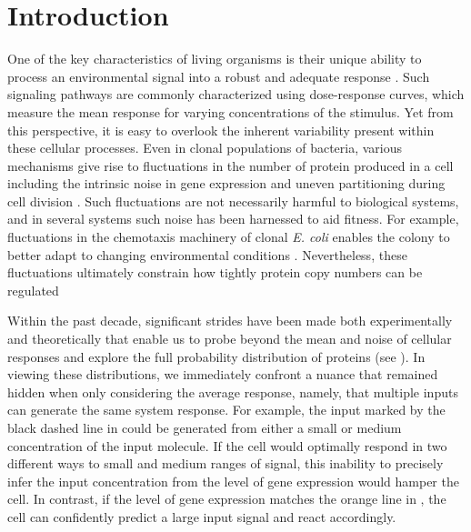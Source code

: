 \section{Introduction}

One of the key characteristics of living organisms is their unique ability to
process an environmental signal into a robust and adequate response
\cite{Nemenman2010}. Such signaling pathways are commonly characterized using
dose-response curves, which measure the mean response for varying concentrations
of the stimulus. Yet from this perspective, it is easy to overlook the inherent
variability present within these cellular processes. %
Even in clonal populations of bacteria, various mechanisms give rise to
fluctuations in the number of protein produced in a cell including the intrinsic
noise in gene expression \cite{Elowitz2002} and uneven partitioning during cell
division \cite{Huh2011}. Such fluctuations are not necessarily harmful to
biological systems, and in several systems such noise has been harnessed to aid
fitness. For example, fluctuations in the chemotaxis machinery of clonal
\textit{E. coli} enables the colony to better adapt to changing environmental
conditions \cite{Frankel2014}. Nevertheless, these fluctuations ultimately
constrain how tightly protein copy numbers can be regulated \cite{Lestas2010}

Within the past decade, significant strides have been made both experimentally
and theoretically that enable us to probe beyond the mean and noise of cellular
responses and explore the full probability distribution of proteins (see
\fref[figExpSetup]). In viewing these distributions, we immediately confront a
nuance that remained hidden when only considering the average response, namely,
that multiple inputs can generate the same system response. For example, the
input marked by the black dashed line in \fref[figExpSetup] could be
generated from either a small or medium concentration of the input molecule. If
the cell would optimally respond in two different ways to small and medium
ranges of signal, this inability to precisely infer the input concentration from
the level of gene expression would hamper the cell. In contrast, if the level of
gene expression matches the orange line in \fref[figExpSetup], the
cell can confidently predict a large input signal and react accordingly.

